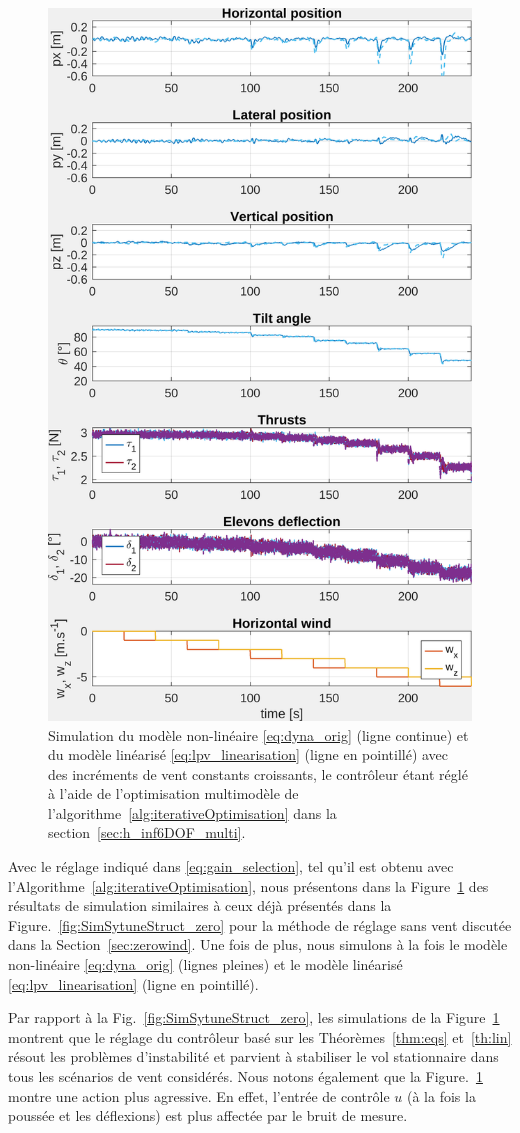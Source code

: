 \begin{figure}[ht!]
    \centering
    \includegraphics[trim=0cm 0cm 0cm 0cm,clip,width=0.6\columnwidth]{figures/sim_systune_lpv_noise.png}
    \caption{Simulation du modèle non-linéaire \eqref{eq:dyna_orig} (ligne continue) et du modèle linéarisé \eqref{eq:lpv_linearisation} (ligne en pointillé) avec des incréments de vent constants croissants, le contrôleur étant réglé à l'aide de l'optimisation multimodèle de l'algorithme~\ref{alg:iterativeOptimisation} dans la section~\ref{sec:h_inf6DOF_multi}.}
    \label{fig:SimSytuneStruct_lpv}
\end{figure}

Avec le réglage indiqué dans \eqref{eq:gain_selection}, tel qu'il est obtenu avec l'Algorithme~\ref{alg:iterativeOptimisation}, nous présentons dans la Figure~\ref{fig:SimSytuneStruct_lpv} des résultats de simulation similaires à ceux déjà présentés dans la Figure.~\ref{fig:SimSytuneStruct_zero} pour la méthode de réglage sans vent discutée dans la Section~\ref{sec:zerowind}. Une fois de plus, nous simulons à la fois le modèle non-linéaire \eqref{eq:dyna_orig} (lignes pleines) et le modèle linéarisé \eqref{eq:lpv_linearisation} (ligne en pointillé). 

Par rapport à la Fig.~\ref{fig:SimSytuneStruct_zero}, les simulations de la Figure~\ref{fig:SimSytuneStruct_lpv} montrent que le réglage du contrôleur basé sur les Théorèmes~\ref{thm:eqs} et~\ref{th:lin} résout les problèmes d'instabilité et parvient à stabiliser le vol stationnaire dans tous les scénarios de vent considérés. Nous notons également que la Figure.~\ref{fig:SimSytuneStruct_lpv} montre une action plus agressive. En effet, l'entrée de contrôle $u$ (à la fois la poussée et les déflexions) est plus affectée par le bruit de mesure.

